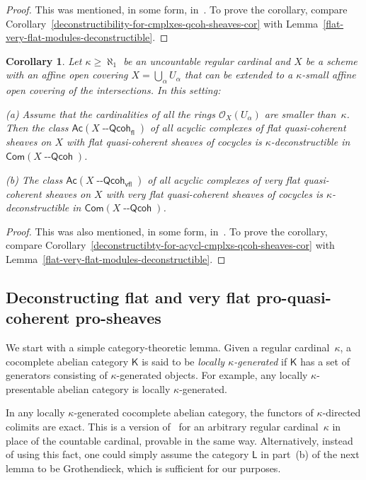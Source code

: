 \documentclass[12pt,a4paper]{amsart}
\newcommand{\+}{\protect\nobreakdash-}
\renewcommand{\:}{\colon}
\newcommand{\Qcoh}{{\operatorname{\mathsf{--Qcoh}}}}
\newcommand{\fl}{\mathsf{fl}}
\newcommand{\vfl}{\mathsf{vfl}}
\newcommand{\Com}{\mathsf{Com}}
\newcommand{\Ac}{\mathsf{Ac}}
\newcommand{\sK}{\mathsf K}
\newcommand{\sL}{\mathsf L}
\newcommand{\cO}{\mathcal O}
\theoremstyle{plain}
\newtheorem{cor}[thm]{Corollary}
\theoremstyle{definition}
\begin{document}
\begin{proof}
 This was mentioned, in some form,
in~\cite[proof of Lemma~5.1.9]{Pcosh}.
 To prove the corollary, compare
Corollary~\ref{deconstructibility-for-cmplxes-qcoh-sheaves-cor}
with Lemma~\ref{flat-very-flat-modules-deconstructible}.
\end{proof}

\begin{cor} \label{pac-cmplxs-of-flat-vfl-sheaves-deconstructible}
 Let\/ $\kappa\ge\aleph_1$ be an uncountable regular cardinal and $X$
be a scheme with an affine open covering $X=\bigcup_\alpha U_\alpha$
that can be extended to a\/ $\kappa$\+small affine open covering of
the intersections.
 In this setting: \par
\textup{(a)} Assume that the cardinalities of all the rings\/
$\cO_X(U_\alpha)$ are smaller than\/~$\kappa$.
 Then the class\/ $\Ac(X\Qcoh_\fl)$ of all acyclic complexes of flat
quasi-coherent sheaves on $X$ with flat quasi-coherent sheaves of
cocycles is\/ $\kappa$\+deconstructible in\/ $\Com(X\Qcoh)$. \par
\textup{(b)} The class\/ $\Ac(X\Qcoh_\vfl)$ of all acyclic complexes of
very flat quasi-coherent sheaves on $X$ with very flat quasi-coherent
sheaves of cocycles is\/ $\kappa$\+deconstructible in\/ $\Com(X\Qcoh)$.
\end{cor}

\begin{proof}
 This was also mentioned, in some form,
in~\cite[proof of Lemma~5.1.1]{Pcosh}.
 To prove the corollary, compare
Corollary~\ref{deconstructibty-for-acycl-cmplxs-qcoh-sheaves-cor}
with Lemma~\ref{flat-very-flat-modules-deconstructible}.
\end{proof}

\subsection{Deconstructing flat and very flat pro-quasi-coherent
pro-sheaves}
 We start with a simple category-theoretic lemma.
 Given a regular cardinal~$\kappa$, a cocomplete abelian category
$\sK$ is said to be \emph{locally\/ $\kappa$\+generated} if $\sK$
has a set of generators consisting of $\kappa$\+generated objects.
 For example, any locally $\kappa$\+presentable abelian category is
locally $\kappa$\+generated.

 In any locally $\kappa$\+generated cocomplete abelian category,
the functors of $\kappa$\+directed colimits are exact.
 This is a version of~\cite[Corollary~9.6]{PS6} for
an arbitrary regular cardinal~$\kappa$ in place of the countable
cardinal, provable in the same way.
 Alternatively, instead of using this fact, one could simply
assume the category $\sL$ in part~(b) of the next lemma to be
Grothendieck, which is sufficient for our purposes.
\end{document}
